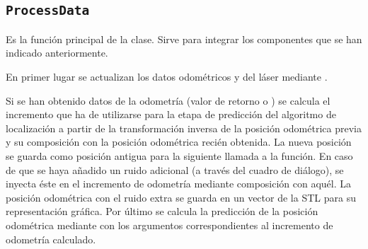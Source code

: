 
%
%
%
%
%
%
%
%
%
%

\subsection{\texttt{ProcessData}}

\noindent
{}

\noindent
Es la función principal de la clase. Sirve para integrar los componentes que se han indicado anteriormente.

\noindent
En primer lugar se actualizan los datos odométricos y del láser mediante .

Si se han obtenido datos de la odometría (valor de retorno  o ) se calcula el incremento que ha de utilizarse para la etapa de predicción del algoritmo de localización a partir de la transformación inversa de la posición odométrica previa y su composición con la posición odométrica recién obtenida. La nueva posición se guarda como posición antigua para la siguiente llamada a la función. En caso de que se haya añadido un ruido adicional (a través del cuadro de diálogo), se inyecta éste en el incremento de odometría mediante composición con aquél. La posición odométrica con el ruido extra se guarda en un vector de la STL para su representación gráfica. Por último se calcula la predicción de la posición odométrica mediante  con los argumentos correspondientes al incremento de odometría calculado.

